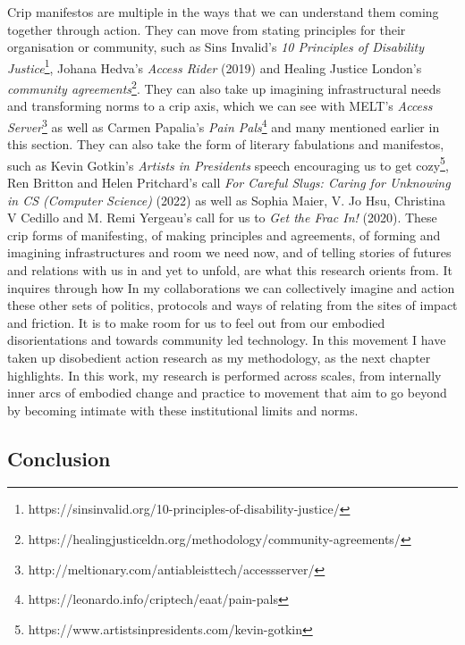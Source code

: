 Crip manifestos are multiple in the ways that we can understand them
coming together through action. They can move from stating principles
for their organisation or community, such as Sins Invalid's \emph{10
Principles of Disability Justice}\footnote{https://sinsinvalid.org/10-principles-of-disability-justice/},
Johana Hedva's \emph{Access Rider} (2019) and Healing Justice London's
\emph{community agreements}\footnote{https://healingjusticeldn.org/methodology/community-agreements/}.
They can also take up imagining infrastructural needs and transforming
norms to a crip axis, which we can see with MELT's \emph{Access
Server}\footnote{http://meltionary.com/antiableisttech/accessserver/} as
well as Carmen Papalia's \emph{Pain Pals}\footnote{https://leonardo.info/criptech/eaat/pain-pals}
and many mentioned earlier in this section. They can also take the form
of literary fabulations and manifestos, such as Kevin Gotkin's
\emph{Artists in Presidents} speech encouraging us to get
cozy\footnote{https://www.artistsinpresidents.com/kevin-gotkin}, Ren
Britton and Helen Pritchard's call \emph{For Careful Slugs: Caring for
Unknowing in CS (Computer Science)} (2022) as well as Sophia Maier, V.
Jo Hsu, Christina V Cedillo and M. Remi Yergeau's call for us to
\emph{Get the Frac In!} (2020). These crip forms of manifesting, of
making principles and agreements, of forming and imagining
infrastructures and room we need now, and of telling stories of futures
and relations with us in and yet to unfold, are what this research
orients from. It inquires through how In my collaborations we can
collectively imagine and action these other sets of politics, protocols
and ways of relating from the sites of impact and friction. It is to
make room for us to feel out from our embodied disorientations and
towards community led technology. In this movement I have taken up
disobedient action research as my methodology, as the next chapter
highlights. In this work, my research is performed across scales, from
internally inner arcs of embodied change and practice to movement that
aim to go beyond by becoming intimate with these institutional limits
and norms.

\hypertarget{conclusion}{%
\subsection{Conclusion}\label{conclusion}}

